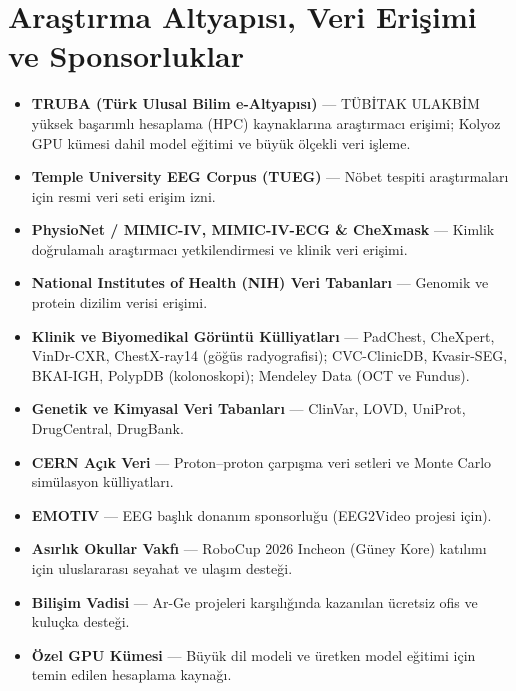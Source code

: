 \documentclass[11pt,a4paper]{article}
\begin{document}
\section*{Araştırma Altyapısı, Veri Erişimi ve Sponsorluklar}
\begin{itemize}
    \item \textbf{TRUBA (Türk Ulusal Bilim e-Altyapısı)} --- TÜBİTAK ULAKBİM yüksek başarımlı hesaplama (HPC) kaynaklarına araştırmacı erişimi; Kolyoz GPU kümesi dahil model eğitimi ve büyük ölçekli veri işleme.
    \item \textbf{Temple University EEG Corpus (TUEG)} --- Nöbet tespiti araştırmaları için resmi veri seti erişim izni.
    \item \textbf{PhysioNet / MIMIC-IV, MIMIC-IV-ECG \& CheXmask} --- Kimlik doğrulamalı araştırmacı yetkilendirmesi ve klinik veri erişimi.
    \item \textbf{National Institutes of Health (NIH) Veri Tabanları} --- Genomik ve protein dizilim verisi erişimi.
    \item \textbf{Klinik ve Biyomedikal Görüntü Külliyatları} --- PadChest, CheXpert, VinDr-CXR, ChestX-ray14 (göğüs radyografisi); CVC-ClinicDB, Kvasir-SEG, BKAI-IGH, PolypDB (kolonoskopi); Mendeley Data (OCT ve Fundus).
    \item \textbf{Genetik ve Kimyasal Veri Tabanları} --- ClinVar, LOVD, UniProt, DrugCentral, DrugBank.
    \item \textbf{CERN Açık Veri} --- Proton--proton çarpışma veri setleri ve Monte Carlo simülasyon külliyatları.
    \item \textbf{EMOTIV} --- EEG başlık donanım sponsorluğu (EEG2Video projesi için).
    \item \textbf{Asırlık Okullar Vakfı} --- RoboCup 2026 Incheon (Güney Kore) katılımı için uluslararası seyahat ve ulaşım desteği.
    \item \textbf{Bilişim Vadisi} --- Ar-Ge projeleri karşılığında kazanılan ücretsiz ofis ve kuluçka desteği.
    \item \textbf{Özel GPU Kümesi} --- Büyük dil modeli ve üretken model eğitimi için temin edilen hesaplama kaynağı.
\end{itemize}

\end{document}
